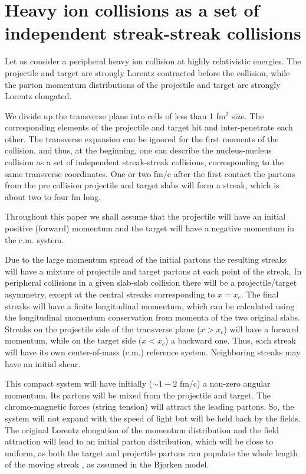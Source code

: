 \documentclass[aps,prc,twocolumn,floatfix,showpacs,a4paper,
nofootinbib,amsmath,amssymb]{revtex4-1}
\begin{document}
\section{Heavy ion collisions as a set of independent streak-streak collisions}


Let us consider a peripheral heavy ion collision at highly relativistic energies. The projectile and target are strongly Lorentz contracted before the collision, while the parton momentum distributions of the projectile and target are strongly Lorentz elongated.

We divide up the transverse plane into cells of less than 1 fm$^2$ size. The corresponding elements of the projectile and target hit and inter-penetrate each other. The transverse expansion can be ignored for the first moments of the collision, and thus, at the beginning, one can describe the nucleus-nucleus collision as a set of independent streak-streak collisions, corresponding to the same transverse coordinates. One or two fm/c after the first contact the partons from the pre collision projectile and target slabs will form a streak, which is about two to four fm long. 

Throughout this paper we shall assume that the projectile will have an initial positive (forward) momentum and the target will have a negative momentum in the c.m. system.  

Due to the large momentum spread of the initial partons the resulting streaks will have a mixture of projectile and target partons at each point of the streak.  In peripheral collisions in a given slab-slab collision there will be a projectile/target asymmetry, except at the central streaks corresponding to $x=x_c$. The final streaks will have a finite longitudinal momentum, which can be calculated using the longitudinal momentum conservation from momenta of the two original slabs. Streaks on the projectile side of the transverse plane ($x>x_c$) will have a forward momentum, while on the target side ($x<x_c$) a backward one. Thus, each streak will have its own center-of-mass (c.m.) reference  system.  Neighboring streaks may have an initial shear. 

This compact 
system will have initially ($\sim 1{-}2$ fm/c) a non-zero angular momentum.
Its partons will be mixed from the projectile and target. The 
chromo-magnetic forces (string tension) will attract the leading
partons.  So, the system will not expand with the speed of light 
but will be held back by the fields. The original Lorentz
elongation of the momentum distribution and the field attraction 
will lead to an initial parton distribution, which will be close 
to uniform, as both the target and projectile partons can 
populate the whole length of the moving streak \cite{Vovchenko}, as assumed in the 
Bjorken model. 
\end{document}
